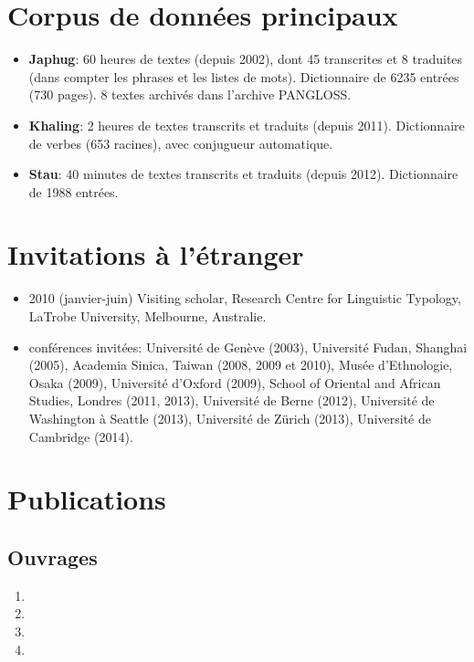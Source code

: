 \documentclass[oldfontcommands,oneside,a4paper,11pt]{article}
\begin{document}
\section*{Corpus de données principaux}
\begin{itemize}
\item \textbf{Japhug}: 60 heures de textes (depuis 2002), dont 45 transcrites et 8 traduites (dans compter les phrases et les listes de mots). Dictionnaire de 6235 entrées (730 pages). 8 textes archivés dans l'archive PANGLOSS.
\item \textbf{Khaling}: 2 heures de textes transcrits et traduits (depuis 2011). Dictionnaire de verbes (653 racines), avec conjugueur automatique.
\item \textbf{Stau}: 40 minutes de textes transcrits et traduits (depuis 2012). Dictionnaire de 1988 entrées.
  \end{itemize}

\section*{Invitations à l'étranger}
\begin{itemize}
\item   2010 (janvier-juin) Visiting scholar, Research Centre for Linguistic Typology, LaTrobe University, Melbourne, Australie.
 \item   conférences invitées:  Université de Genève (2003), Université Fudan, Shanghai (2005), Academia Sinica, Taiwan (2008, 2009 et 2010), Musée d'Ethnologie, Osaka (2009), Université d'Oxford (2009), School of Oriental and African Studies, Londres (2011, 2013), Université de Berne (2012), Université de Washington à Seattle (2013), Université de Zürich (2013), Université de Cambridge (2014).
  \end{itemize}
    
\section{Publications}
  \subsection*{Ouvrages}
  \begin{enumerate}

 \item  {}
\item {}
   \item {}
  \item  {}
     
\end{enumerate}
\end{document}
